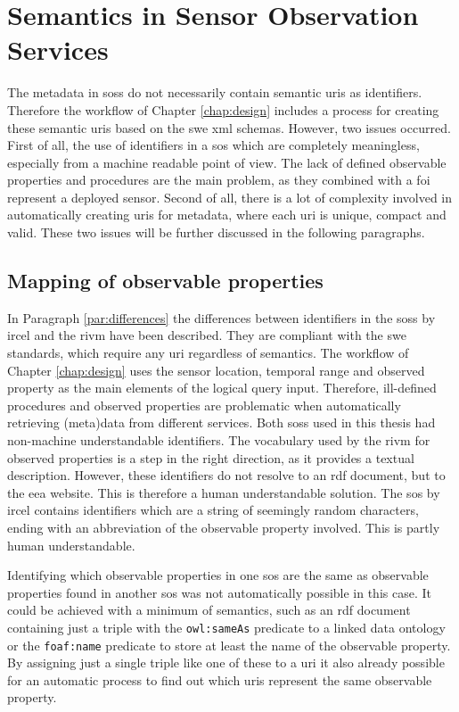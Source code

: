 \section{Semantics in Sensor Observation Services}
The metadata in \aclp{sos} do not necessarily contain semantic \acp{uri} as identifiers. Therefore the workflow of Chapter \ref{chap:design} includes a process for creating these semantic \acp{uri} based on the \ac{swe} \ac{xml} schemas. However, two issues occurred. First of all, the use of identifiers  in a \ac{sos} which are completely meaningless, especially from a machine readable point of view. The lack of defined observable properties and procedures are the main problem, as they combined with a \ac{foi} represent a deployed sensor. Second of all, there is a lot of complexity involved in automatically creating \acp{uri} for metadata, where each \ac{uri} is unique, compact and valid. These two issues will be further discussed in the following paragraphs. 

\subsection{Mapping of observable properties}
In Paragraph \ref{par:differences} the differences between identifiers in the \aclp{sos} by \ac{ircel} and the \ac{rivm} have been described. They are compliant with the \ac{swe} standards, which require any \ac{uri} regardless of semantics. The workflow of Chapter \ref{chap:design} uses the sensor location, temporal range and observed property as the main elements of the logical query input. Therefore, ill-defined procedures and observed properties are problematic when automatically retrieving (meta)data from different services. Both \aclp{sos} used in this thesis had non-machine understandable identifiers. The vocabulary used by the \ac{rivm} for observed properties is a step in the right direction, as it provides a textual description. However, these identifiers do not resolve to an \ac{rdf} document, but to the \ac{eea} website. This is therefore a human understandable solution. The \ac{sos} by \ac{ircel} contains identifiers which are a string of seemingly random characters, ending with an abbreviation of the observable property involved. This is partly human understandable.   

Identifying which observable properties in one \ac{sos} are the same as observable properties found in another \ac{sos} was not automatically possible in this case. It could be achieved with a minimum of semantics, such as an \ac{rdf} document containing just a triple with the \texttt{owl:sameAs} predicate to a linked data ontology or the \texttt{foaf:name} predicate to store at least the name of the observable property. By assigning just a single triple like one of these to a \ac{uri} it also already possible for an automatic process to find out which \acp{uri} represent the same observable property. 

